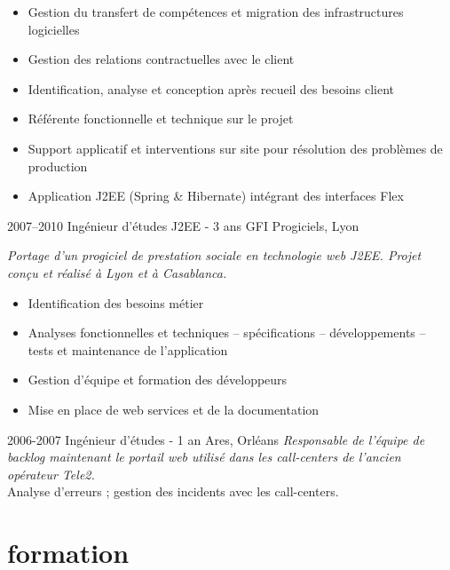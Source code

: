 \documentclass[hidelinks]{friggeri-cv} %
\begin{document}
\begin{entrylist}
{\begin{itemize}
\item Gestion du transfert de compétences et migration des infrastructures logicielles
\item Gestion des relations contractuelles avec le client
\item Identification, analyse et conception après recueil des besoins client
\item Référente fonctionnelle et technique sur le projet
\item Support applicatif et interventions sur site pour résolution des problèmes de production
\item Application J2EE (Spring \& Hibernate) intégrant des interfaces Flex
\end{itemize}
\vspace*{3mm}}
\entry
{2007--2010}
{Ingénieur d’études J2EE {\normalfont - 3 ans}}
{GFI Progiciels, Lyon}
{\emph{Portage d’un progiciel de prestation sociale en technologie web J2EE. Projet conçu et réalisé à Lyon et à Casablanca.}
\begin{itemize}
\item Identification des besoins métier
\item Analyses fonctionnelles et techniques – spécifications – développements – tests et maintenance de l’application
\item Gestion d’équipe et formation des développeurs
\item Mise en place de web services et de la documentation
\end{itemize}
\vspace*{3mm}}
\entry
{2006-2007}
{Ingénieur d’études {\normalfont - 1 an}}
{Ares, Orléans}
{\emph{Responsable de l’équipe de backlog maintenant le portail web utilisé dans les call-centers de l’ancien opérateur Tele2.} \\
Analyse d’erreurs ; gestion des incidents avec les call-centers.}
\end{entrylist}


\section{formation}
\end{document}
